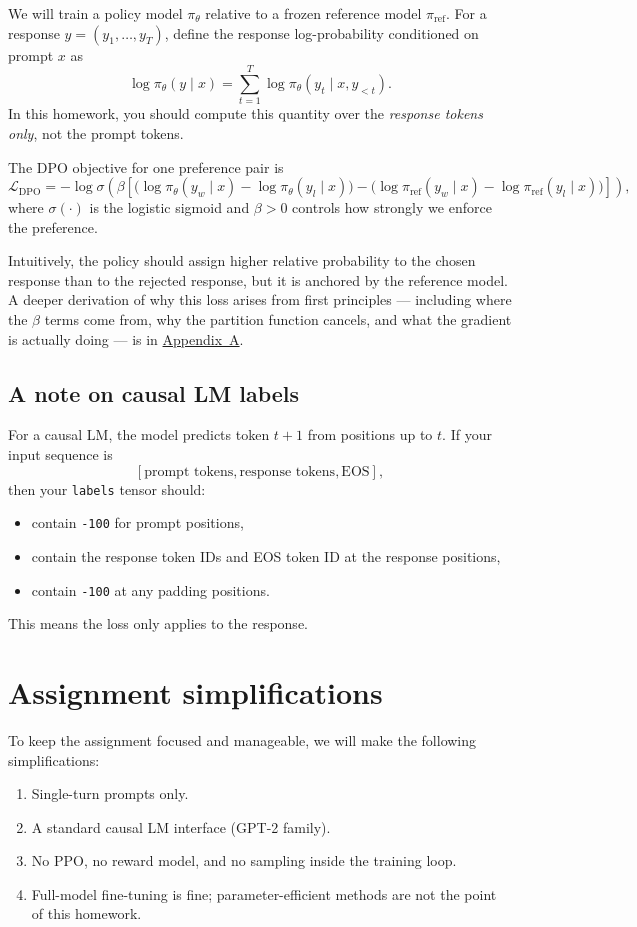 \documentclass[11pt]{article}
\newcommand{\ignore}{\texttt{-100}}
\begin{document}
We will train a policy model \(\pi_\theta\) relative to a frozen reference model \(\pi_{\mathrm{ref}}\). For a response \(y = (y_1, \dots, y_T)\), define the response log-probability conditioned on prompt \(x\) as
\[
\log \pi_\theta(y \mid x)
=
\sum_{t=1}^{T}
\log \pi_\theta(y_t \mid x, y_{<t}).
\]
In this homework, you should compute this quantity over the \emph{response tokens only}, not the prompt tokens.

The DPO objective for one preference pair is
\[
\mathcal{L}_{\mathrm{DPO}}
=
-\log \sigma\!\left(
\beta
\left[
\bigl(\log \pi_\theta(y_w \mid x) - \log \pi_\theta(y_l \mid x)\bigr)
-
\bigl(\log \pi_{\mathrm{ref}}(y_w \mid x) - \log \pi_{\mathrm{ref}}(y_l \mid x)\bigr)
\right]
\right),
\]
where \(\sigma(\cdot)\) is the logistic sigmoid and \(\beta > 0\) controls how strongly we enforce the preference.

Intuitively, the policy should assign higher relative probability to the chosen response than to the rejected response, but it is anchored by the reference model.
A deeper derivation of why this loss arises from first principles — including where the \(\beta\) terms come from, why the partition function cancels, and what the gradient is actually doing — is in \hyperref[app:dpo-intuition]{Appendix~A}.

\subsection*{A note on causal LM labels}

For a causal LM, the model predicts token \(t+1\) from positions up to \(t\). If your input sequence is
\[
[\text{prompt tokens}, \text{response tokens}, \text{EOS}],
\]
then your \texttt{labels} tensor should:
\begin{itemize}[itemsep=0.25em]
    \item contain \ignore{} for prompt positions,
    \item contain the response token IDs and EOS token ID at the response positions,
    \item contain \ignore{} at any padding positions.
\end{itemize}
This means the loss only applies to the response.

\section*{Assignment simplifications}

To keep the assignment focused and manageable, we will make the following simplifications:
\begin{enumerate}[itemsep=0.25em]
    \item Single-turn prompts only.
    \item A standard causal LM interface (GPT-2 family).
    \item No PPO, no reward model, and no sampling inside the training loop.
    \item Full-model fine-tuning is fine; parameter-efficient methods are not the point of this homework.
\end{enumerate}
\end{document}
